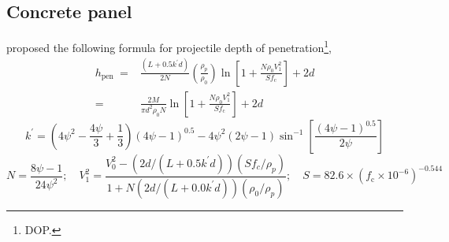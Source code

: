 \documentclass[]{article} %
\begin{document}
\subsection*{Concrete panel}
\cite{forrestal1994empirical,forrestal1996penetration,frew2006effect,frew1998penetration} proposed the following formula for projectile depth of penetration\footnote{DOP.},
\begin{equation}\label{eq01}
  \begin{aligned}
  h_{\text {pen }}=&\frac{\left(L+0.5 k^{\prime} d\right)}{2 N}\left(\frac{\rho_p}{\rho_0}\right) \ln \left[1+\frac{N \rho_0 V_1^2}{S f_{\mathrm{c}}}\right]+2 d \\
  =&\frac{2 M}{\pi d^2 \rho_0 N} \ln \left[1+\frac{N \rho_0 V_1^2}{S f_{\mathrm{c}}}\right]+2 d
  \end{aligned}
\end{equation}
\begin{equation}\label{eq02}
k^{\prime}=\left(4 \psi^2-\frac{4 \psi}{3}+\frac{1}{3}\right)(4 \psi-1)^{0.5}-4 \psi^2(2 \psi-1) \sin ^{-1}\left[\frac{(4 \psi-1)^{0.5}}{2 \psi}\right] 
  \end{equation}
  \begin{equation}\label{eq03}
  N=\frac{8 \psi-1}{24 \psi^2}; \quad V_1^2=\frac{V_0^2-\left({2 d}/({L+0.5 k^{\prime} d})\right)\left({S f_c}/{\rho_p}\right)}{1+N\left({2 d}/({L+0.0 k^{\prime} d})\right)\left({\rho_0}/{\rho_p}\right)} ; \quad S=82.6 \times\left(f_{\mathrm{c}} \times 10^{-6}\right)^{-0.544}
  \end{equation}
\end{document}
